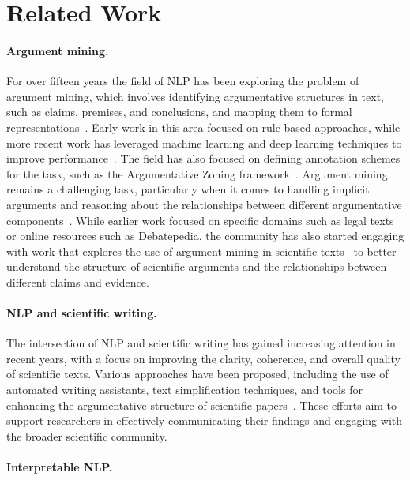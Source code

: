 \section{Related Work}
\label{sec:related}

\paragraph{Argument mining.}
For over fifteen years the field of NLP has been exploring the problem of argument mining, which involves identifying argumentative structures in text, such as claims, premises, and conclusions, and
mapping them to formal representations~\citep{}. Early work in this area focused on rule-based approaches, while more recent work has leveraged machine learning and deep learning techniques to improve
performance~\citep{}. The field has also focused on defining annotation schemes for the task, such as the Argumentative Zoning framework~\citep{}.
Argument mining remains a challenging task, particularly when it comes to handling implicit arguments and reasoning about the relationships between different argumentative
components~\citep{}. While earlier work focused on specific domains such as legal texts or online resources such as Debatepedia, the community has also started engaging with work that explores the use of argument mining in scientific texts~\citep{liakata2012automatic,...} to better understand the structure of scientific arguments and the relationships between different claims and evidence. 

\paragraph{NLP and scientific writing.} The intersection of NLP and scientific writing has gained increasing attention in recent years, with a focus on improving the clarity, coherence, and overall quality of scientific texts. Various approaches have been proposed, including the use of automated writing assistants, text simplification techniques, and tools for enhancing the argumentative structure of scientific papers~\citep{..,}. These efforts aim to support researchers in effectively communicating their findings and engaging with the broader scientific community.

\paragraph{Interpretable NLP.}

